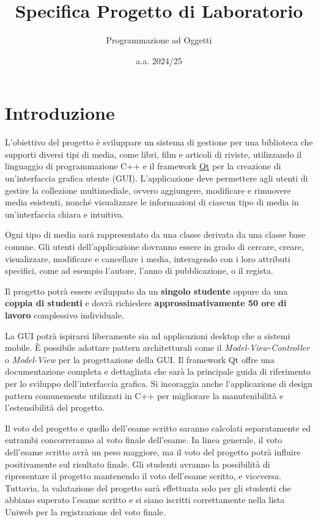 \documentclass[10pt,a4paper,oneside]{article}
\title{Specifica Progetto di Laboratorio}
\author{Programmazione ad Oggetti}
\date{a.a. 2024/25}
\begin{document}
\maketitle

\section{Introduzione}
L'obiettivo del progetto è sviluppare un sistema di gestione per una biblioteca che supporti diversi tipi di media, come libri, film e articoli di riviste, utilizzando il linguaggio di programmazione C++ e il framework \href{https://www.qt.io/?hsLang=en}{Qt} per la creazione di un'interfaccia grafica utente (GUI). L'applicazione deve permettere agli utenti di gestire la collezione multimediale, ovvero aggiungere, modificare e rimuovere media esistenti, nonché visualizzare le informazioni di ciascun tipo di media in un'interfaccia chiara e intuitiva.

Ogni tipo di media sarà rappresentato da una classe derivata da una classe base comune. Gli utenti dell'applicazione dovranno essere in grado di cercare, creare, visualizzare, modificare e cancellare i media, interagendo con i loro attributi specifici, come ad esempio l'autore, l'anno di pubblicazione, o il regista.

Il progetto potrà essere sviluppato da un \textbf{singolo studente} oppure da una \textbf{coppia di studenti} e dovrà richiedere \textbf{approssimativamente 50 ore di lavoro} complessivo individuale.

La GUI potrà ispirarsi liberamente sia ad applicazioni desktop che a sistemi mobile. È possibile adottare pattern architetturali come il \emph{Model-View-Controller} o \emph{Model-View} per la progettazione della GUI. Il framework Qt offre una documentazione completa e dettagliata che sarà la principale guida di riferimento per lo sviluppo dell'interfaccia grafica. Si incoraggia anche l'applicazione di design pattern comunemente utilizzati in C++ per migliorare la manutenibilità e l'estensibilità del progetto.

Il voto del progetto e quello dell'esame scritto saranno calcolati separatamente ed entrambi concorreranno al voto finale dell'esame. In linea generale, il voto dell'esame scritto avrà un peso maggiore, ma il voto del progetto potrà influire positivamente sul risultato finale. Gli studenti avranno la possibilità di ripresentare il progetto mantenendo il voto dell'esame scritto, e viceversa. Tuttavia, la valutazione del progetto sarà effettuata solo per gli studenti che abbiano superato l'esame scritto e si siano iscritti correttamente nella lista Uniweb per la registrazione del voto finale.
\end{document}

